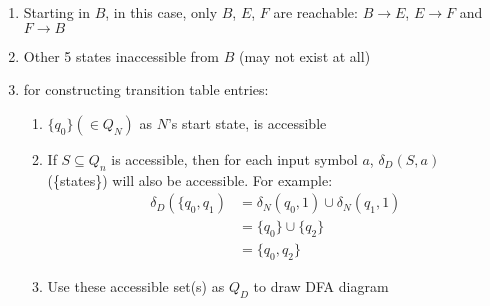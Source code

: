 \begin{enumerate}
\item Starting in $B$, in this case, only $B$, $E$, $F$ are reachable: $B\to E$, $E\to F$ and $F\to B$
\item Other 5 states inaccessible from $B$ (may not exist at all)
\item {} for constructing transition table entries:
  \begin{enumerate}[label={\alph*.}]
  \item $\{q_{0}\} (\in Q_{N})$ as $N$'s start state, is accessible
  \item If $S \subseteq Q_{n}$ is accessible, then for each input symbol $a$, $\delta_{D}(S,a)$ (\{states\}) will also be accessible. For example:
    \begin{align*}
      \delta_{D}(\{q_{0},q_{1}) & = \delta_{N}(q_{0},1) \cup \delta_{N}(q_{1}, 1)\\
                                & = \{q_{0}\} \cup \{q_{2}\} \\
                                & = \{q_{0},q_{2}\}
    \end{align*}
  \item Use these accessible set(s) as $Q_{D}$ to draw DFA diagram
  \end{enumerate}
\end{enumerate}
\begin{minipage}{\linewidth}
  \centering
\end{minipage}

